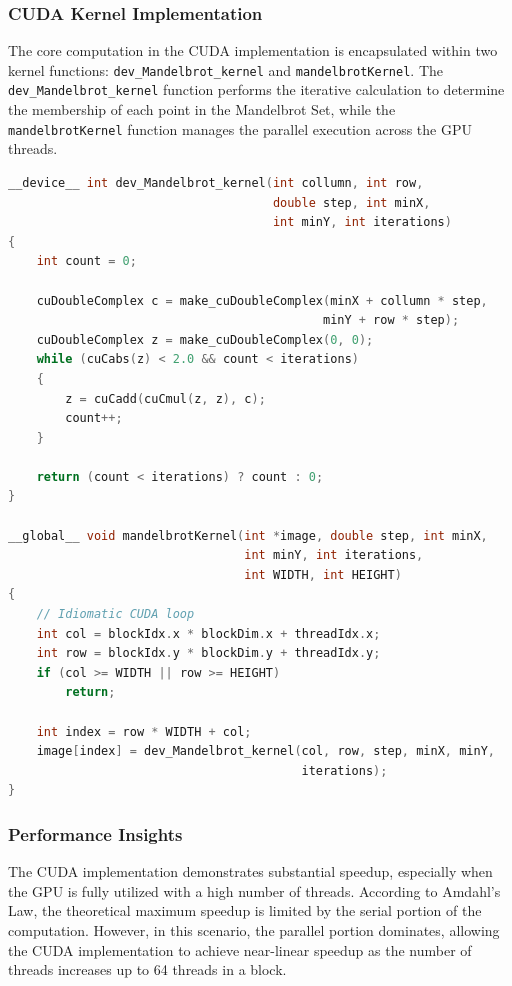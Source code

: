 \documentclass[
	report, %
	11pt, %
]{CSUniSchoolLabReport}
\newcounter{ct}
\begin{document}
\subsubsection{CUDA Kernel Implementation}

The core computation in the CUDA implementation is encapsulated within two kernel functions: \texttt{dev\_Mandelbrot\_kernel} and \texttt{mandelbrotKernel}. The \texttt{dev\_Mandelbrot\_kernel} function performs the iterative calculation to determine the membership of each point in the Mandelbrot Set, while the \texttt{mandelbrotKernel} function manages the parallel execution across the GPU threads.

\begin{lstlisting}[language=C++, caption={CUDA Kernel Functions for Mandelbrot Set Computation}, label={lst:mandelbrot_cuda}]
__device__ int dev_Mandelbrot_kernel(int collumn, int row,
                                     double step, int minX,
                                     int minY, int iterations)
{
    int count = 0;

    cuDoubleComplex c = make_cuDoubleComplex(minX + collumn * step,
                                            minY + row * step);
    cuDoubleComplex z = make_cuDoubleComplex(0, 0);
    while (cuCabs(z) < 2.0 && count < iterations)
    {
        z = cuCadd(cuCmul(z, z), c);
        count++;
    }

    return (count < iterations) ? count : 0;
}

__global__ void mandelbrotKernel(int *image, double step, int minX,
                                 int minY, int iterations,
                                 int WIDTH, int HEIGHT)
{
    // Idiomatic CUDA loop
    int col = blockIdx.x * blockDim.x + threadIdx.x;
    int row = blockIdx.y * blockDim.y + threadIdx.y;
    if (col >= WIDTH || row >= HEIGHT)
        return;

    int index = row * WIDTH + col;
    image[index] = dev_Mandelbrot_kernel(col, row, step, minX, minY,
                                         iterations);
}
\end{lstlisting}

\subsubsection{Performance Insights}

The CUDA implementation demonstrates substantial speedup, especially when the GPU is fully utilized with a high number of threads. According to Amdahl's Law, the theoretical maximum speedup is limited by the serial portion of the computation. However, in this scenario, the parallel portion dominates, allowing the CUDA implementation to achieve near-linear speedup as the number of threads increases up to 64 threads in a block.
\end{document}
